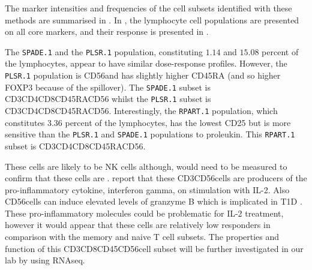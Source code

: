 The marker intensities and frequencies of the cell subsets identified with these methods are summarised in .
In , the lymphocyte cell populations are presented on all core markers, and their response is presented in .

The \texttt{SPADE.1} and the \texttt{PLSR.1} population, constituting $1.14$ and $15.08$ percent of the lymphocytes, appear to have similar dose-response profiles.
However, the \texttt{PLSR.1} population is CD56\negative and has slightly higher CD45RA (and so higher FOXP3 because of the spillover).
The \texttt{SPADE.1} subset is CD3\positive CD4\negative CD8\positive CD45RA\positive CD56\positive
whilst the \texttt{PLSR.1} subset is CD3\positive CD4\negative CD8\positive CD45RA\high CD56\negative.
Interestingly, the \texttt{RPART.1} population, which constitutes 3.36 percent of the lymphocytes, has the lowest CD25 but is more sensitive than the \texttt{PLSR.1} and \texttt{SPADE.1} populations to proleukin.  
This \texttt{RPART.1} subset is CD3\negative CD4\negative CD8\negative CD45RA\positive CD56\positive.

These cells are likely to be NK cells although,  would need to be measured to confirm that these cells are \positive.
\citet{Ortaldo:1992tr} report that these CD3\negative CD56\positive cells are producers of the pro-inflammatory cytokine, interferon gamma, on stimulation with IL-2.
Also CD56\positive cells can induce elevated levels of granzyme B which is implicated in \gls{T1D} \citep{Thomas:2010cy}.
These pro-inflammatory molecules could be problematic for IL-2 treatment, however it would appear that these cells are relatively low responders in comparison with the memory and naive T cell subsets.
The properties and function of this CD3\negative CD8\negative CD45\positive CD56\positive cell subset will be further investigated in our lab by  using RNAseq.


